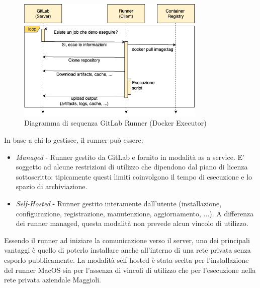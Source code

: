 \begin{figure}[H]
\centering
\includegraphics[width=0.8\textwidth]{img/tesi-17-runner.drawio.png}
\caption{Diagramma di sequenza GitLab Runner (Docker Executor)}
\end{figure}

In base a chi lo gestisce, il runner può essere:
\begin{itemize}
    \item \textit{Managed} - Runner gestito da GitLab e fornito in modalità as a service. E' soggetto ad alcune restrizioni di utilizzo che dipendono dal piano di licenza sottoscritto: tipicamente questi limiti coinvolgono il tempo di esecuzione e lo spazio di archiviazione.
    \item \textit{Self-Hosted} - Runner gestito interamente dall'utente (installazione, configurazione, registrazione, manutenzione, aggiornamento, ...). A differenza dei runner managed, questa modalità non prevede alcun vincolo di utilizzo.
\end{itemize}

Essendo il runner ad iniziare la comunicazione verso il server, uno dei principali vantaggi è quello di poterlo installare anche all'interno di una rete privata senza esporlo pubblicamente. La modalità self-hosted è stata scelta per l'installazione del runner MacOS sia per l'assenza di vincoli di utilizzo che per l'esecuzione nella rete privata aziendale Maggioli.

